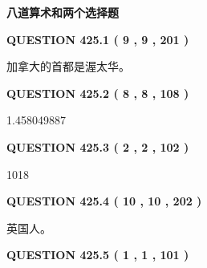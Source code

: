 \documentclass{ctexart}
\begin{document}
   
   
   
   
   
 \vspace{0.2in}
{\LARGE {\textbf{ 八道算术和两个选择题}}}
   
   
  
\vspace{0.2in}
  
{\textbf{\Large{QUESTION
425.1 
 ( 9 , 9 , 201 )
}}}
  
  
 
 
\noindent{}
 
 
加拿大的首都是渥太华。
 
 
 
 
  
\vspace{0.2in}
  
{\textbf{\Large{QUESTION
425.2 
 ( 8 , 8 , 108 )
}}}
  
  
 
 
\noindent{}

1.458049887
 
 
  
\vspace{0.2in}
  
{\textbf{\Large{QUESTION
425.3 
 ( 2 , 2 , 102 )
}}}
  
  
 
 
\noindent{}

1018
 
 
  
\vspace{0.2in}
  
{\textbf{\Large{QUESTION
425.4 
 ( 10 , 10 , 202 )
}}}
  
  
 
 
\noindent{}
 
 
英国人。
 
 
 
 
  
\vspace{0.2in}
  
{\textbf{\Large{QUESTION
425.5 
 ( 1 , 1 , 101 )
}}}
  
\end{document}
